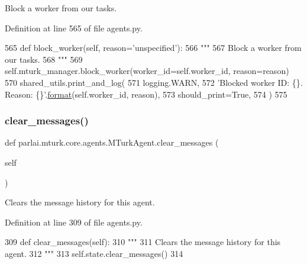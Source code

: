 \begin{DoxyVerb}Block a worker from our tasks.
\end{DoxyVerb}
 

Definition at line 565 of file agents.\+py.


\begin{DoxyCode}
565     \textcolor{keyword}{def }block\_worker(self, reason='unspecified'):
566         \textcolor{stringliteral}{"""}
567 \textcolor{stringliteral}{        Block a worker from our tasks.}
568 \textcolor{stringliteral}{        """}
569         self.mturk\_manager.block\_worker(worker\_id=self.worker\_id, reason=reason)
570         shared\_utils.print\_and\_log(
571             logging.WARN,
572             \textcolor{stringliteral}{'Blocked worker ID: \{\}. Reason: \{\}'}.\hyperlink{namespaceparlai_1_1chat__service_1_1services_1_1messenger_1_1shared__utils_a32e2e2022b824fbaf80c747160b52a76}{format}(self.worker\_id, reason),
573             should\_print=\textcolor{keyword}{True},
574         )
575 
\end{DoxyCode}
\mbox{\label{classparlai_1_1mturk_1_1core_1_1agents_1_1MTurkAgent_af49362633aadb0306a5350dc9700e9b5}} 
\subsubsection{\texorpdfstring{clear\+\_\+messages()}{clear\_messages()}}
{\footnotesize\ttfamily def parlai.\+mturk.\+core.\+agents.\+M\+Turk\+Agent.\+clear\+\_\+messages (\begin{DoxyParamCaption}\item[{}]{self }\end{DoxyParamCaption})}

\begin{DoxyVerb}Clears the message history for this agent.
\end{DoxyVerb}
 

Definition at line 309 of file agents.\+py.


\begin{DoxyCode}
309     \textcolor{keyword}{def }clear\_messages(self):
310         \textcolor{stringliteral}{"""}
311 \textcolor{stringliteral}{        Clears the message history for this agent.}
312 \textcolor{stringliteral}{        """}
313         self.state.clear\_messages()
314 
\end{DoxyCode}
\mbox{\label{classparlai_1_1mturk_1_1core_1_1agents_1_1MTurkAgent_a5bd91f1939122df606623b61c0467976}} 
